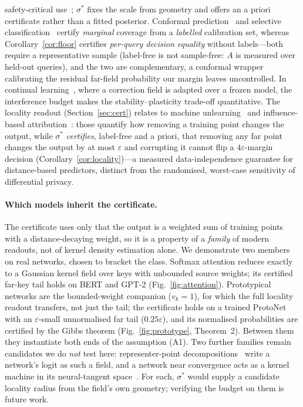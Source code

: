 \documentclass[10pt,twocolumn]{article}
\newcommand{\sstar}{\sigma^{*}}
\begin{document}
safety-critical use~\cite{gp_safe2021}; $\sstar$ fixes the scale from geometry and offers an a priori certificate rather than a fitted posterior. Conformal prediction~\cite{vovk2005,angelopoulos2023,lei2018} and selective classification~\cite{geifman2017} certify \emph{marginal} coverage from a \emph{labelled} calibration set, whereas Corollary~\ref{cor:floor} certifies \emph{per-query decision equality} without labels---both require a representative sample (label-free is not sample-free: $A$ is measured over held-out queries), and the two are complementary, a conformal wrapper calibrating the residual far-field probability our margin leaves uncontrolled. In continual learning~\cite{kirkpatrick2017,rebuffi2017}, where a correction field is adapted over a frozen model, the interference budget makes the stability--plasticity trade-off quantitative. The locality readout (Section~\ref{sec:cert}) relates to machine unlearning~\cite{ginart2019} and influence-based attribution~\cite{koh2017}: those quantify how removing a training point changes the output, while $\sstar$ \emph{certifies}, label-free and a priori, that removing any far point changes the output by at most $\varepsilon$ and corrupting it cannot flip a $4\varepsilon$-margin decision (Corollary~\ref{cor:locality})---a measured data-independence guarantee for distance-based predictors, distinct from the randomised, worst-case sensitivity of differential privacy.


\paragraph{Which models inherit the certificate.} The certificate uses only that the output is a weighted sum of training points with a distance-decaying weight, so it is a property of a \emph{family} of modern readouts, not of kernel density estimation alone. We demonstrate two members on real networks, chosen to bracket the class. Softmax attention reduces exactly to a Gaussian kernel field over keys with unbounded source weights; its certified far-key tail holds on BERT and GPT-2 (Fig.~\ref{fig:attention}). Prototypical networks are the bounded-weight companion ($v_k=1$), for which the full locality readout transfers, not just the tail; the certificate holds on a trained ProtoNet with an $\varepsilon$-small unnormalised far tail ($0.25\varepsilon$), and its normalised probabilities are certified by the Gibbs theorem (Fig.~\ref{fig:prototype}, Theorem~2). Between them they instantiate both ends of the assumption (A1). Two further families remain candidates we do \emph{not} test here: representer-point decompositions~\cite{yeh2018} write a network's logit as such a field, and a network near convergence acts as a kernel machine in its neural-tangent space~\cite{jacot2018}. For each, $\sstar$ would supply a candidate locality radius from the field's own geometry; verifying the budget on them is future work.
\end{document}
